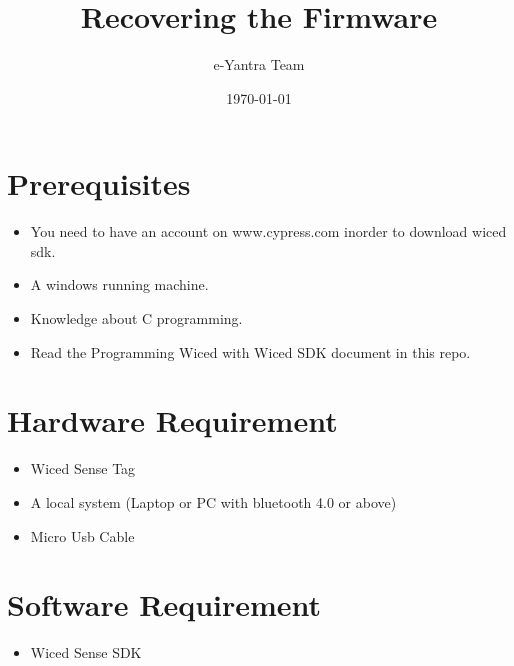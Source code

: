 \documentclass[11pt,a4paper]{article}
\begin{document}
\begin{titlepage}
\title{Recovering the Firmware}
\author{e-Yantra Team}
\date{\today}
\maketitle
\end{titlepage}
 \tableofcontents
 
 
 \newpage
	\section{Prerequisites}
	\begin{itemize}
	\item You need to have an account on www.cypress.com inorder to download wiced sdk.
	\item A windows running machine.
	\item Knowledge about C programming.
	\item Read the Programming Wiced with Wiced SDK document in this repo.
	\end{itemize}
	
	\section{Hardware Requirement}
	\begin{itemize}
	\item Wiced Sense Tag
	\item A local system (Laptop or PC with bluetooth 4.0 or above)
	\item Micro Usb Cable
	\end{itemize}
	
	\section{Software Requirement}
	\begin{itemize}
	\item Wiced Sense SDK
	\end{itemize}
	
	
\newpage
\end{document}
